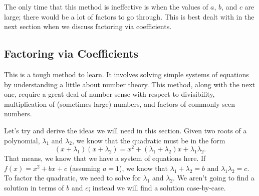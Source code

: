 \documentclass[../book.tex]{subfiles}
\begin{document}
The only time that this method is ineffective is when the values of $a$, $b$, and $c$ are large; there would be a lot of factors to go through.  This is best dealt with in the next section when we discuss factoring via coefficients.
\subsection{Factoring via Coefficients}
\noindent This is a tough method to learn.  It involves solving simple systems of equations by understanding a little about number theory.  This method, along with the next one, require a great deal of number sense with respect to divisibility, multiplication of (sometimes large) numbers, and factors of commonly seen numbers.

Let's try and derive the ideas we will need in this section.  Given two roots of a polynomial, $\lambda_1$ and $\lambda_2$, we know that the quadratic must be in the form $$(x+\lambda_1)(x+\lambda_2)=x^2+\left(\lambda_1+\lambda_2\right)x+\lambda_1\lambda_2.$$  That means, we know that we have a system of equations here.  If $f(x)=x^2+bx+c$ (assuming $a=1$), we know that $\lambda_1+\lambda_2=b$ and $\lambda_1\lambda_2=c$.  To factor the quadratic, we need to solve for $\lambda_1$ and $\lambda_2$.  We aren't going to find a solution in terms of $b$ and $c$; instead we will find a solution case-by-case.
\end{document}
